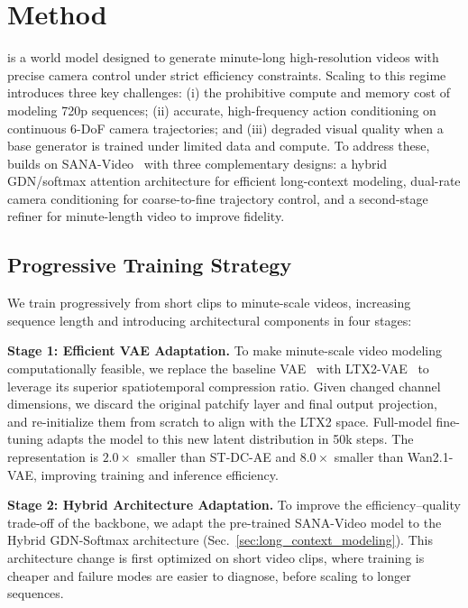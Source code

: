 \section{Method}
\label{sec:method}



\modelname is a world model designed to generate minute-long high-resolution videos with precise camera control under strict efficiency constraints. 
Scaling to this regime introduces three key challenges: (i) the prohibitive compute and memory cost of modeling 720p sequences; (ii) accurate, high-frequency action conditioning on continuous 6-DoF camera trajectories; and (iii) degraded visual quality when a base generator is trained under limited data and compute. 
To address these, \modelname builds on SANA-Video~\citep{chen2025sana} with three complementary designs: a hybrid GDN/softmax attention architecture for efficient long-context modeling, dual-rate camera conditioning for coarse-to-fine trajectory control, and a second-stage refiner for minute-length video to improve fidelity.


\subsection{Progressive Training Strategy}
\label{sec:training_strategy}

We train progressively from short clips to minute-scale videos, increasing sequence length and introducing architectural components in four stages:

\noindent\textbf{Stage 1: Efficient VAE Adaptation.}
To make minute-scale video modeling computationally feasible, we replace the baseline VAE~\citep{wan, dc-video-gen} with LTX2-VAE~\citep{ltx2} to leverage its superior spatiotemporal compression ratio. 
Given changed channel dimensions, we discard the original patchify layer and final output projection, and re-initialize them from scratch to align with the LTX2 space. 
Full-model fine-tuning adapts the model to this new latent distribution in 50k steps. 
The representation is $2.0\times$ smaller than ST-DC-AE and $8.0\times$ smaller than Wan2.1-VAE, improving training and inference efficiency.


\noindent\textbf{Stage 2: Hybrid Architecture Adaptation.} 
To improve the efficiency--quality trade-off of the backbone, we adapt the pre-trained SANA-Video model to the Hybrid GDN-Softmax architecture (Sec.~\ref{sec:long_context_modeling}). This architecture change is first optimized on short video clips, where training is cheaper and failure modes are easier to diagnose, before scaling to longer sequences.

